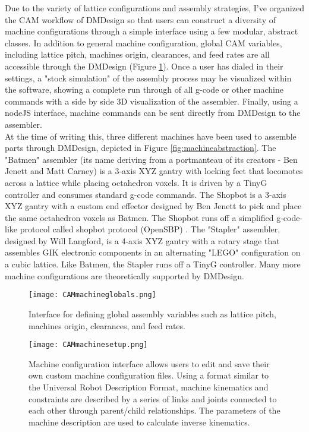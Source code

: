 {Due to the variety of lattice configurations and assembly strategies, I've organized the CAM workflow of DMDesign so that users can construct a diversity of machine configurations through a simple interface using a few modular, abstract classes.  In addition to general machine configuration, global CAM variables, including lattice pitch, machines origin, clearances, and feed rates are all accessible through the DMDesign (Figure \ref{fig:CAMmachineglobals}).  Once a user has dialed in their settings, a "stock simulation" of the assembly process may be visualized within the software, showing a complete run through of all g-code or other machine commands with a side by side 3D visualization of the assembler.  Finally, using a nodeJS interface, machine commands can be sent directly from DMDesign to the assembler.\\

At the time of writing this, three different machines have been used to assemble parts through DMDesign, depicted in Figure \ref{fig:machineabstraction}.  The "Batmen" assembler (its name deriving from a portmanteau of its creators - Ben Jenett and Matt Carney) is a 3-axis XYZ gantry with locking feet that locomotes across a lattice while placing octahedron voxels.  It is driven by a TinyG controller \cite{Synthetos2016} and consumes standard g-code commands.  The Shopbot is a 3-axis XYZ gantry with a custom end effector designed by Ben Jenett to pick and place the same octahedron voxels as Batmen.  The Shopbot runs off a simplified g-code-like protocol called shopbot protocol (OpenSBP) \cite{Shopbot2016}.  The "Stapler" assembler, designed by Will Langford, is a 4-axis XYZ gantry with a rotary stage that assembles GIK electronic components in an alternating "LEGO" configuration on a cubic lattice.  Like Batmen, the Stapler runs off a TinyG controller.  Many more machine configurations are theoretically supported by DMDesign.\\

\begin{figure}
  \texttt{[image: CAMmachineglobals.png]}
  \caption{Interface for defining global assembly variables such as lattice pitch, machines origin, clearances, and feed rates.}
  \label{fig:CAMmachineglobals}
\end{figure}


\begin{figure}
  \texttt{[image: CAMmachinesetup.png]}
  \caption{Machine configuration interface allows users to edit and save their own custom machine configuration files.  Using a format similar to the Universal Robot Description Format, machine kinematics and constraints are described by a series of links and joints connected to each other through parent/child relationships.  The parameters of the machine description are used to calculate inverse kinematics.}
  \label{fig:CAMmachinesetup}
\end{figure}

}
